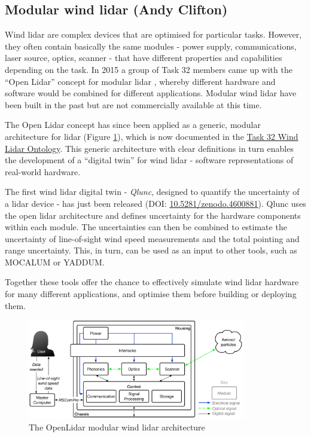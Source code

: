 \subsection{Modular wind lidar (Andy Clifton)}
\begin{altquote}
Wind lidar are complex devices that are optimised for particular tasks. However, they often contain basically the same modules - power supply, communications, laser source, optics, scanner - that have different properties and capabilities depending on the task. In 2015 a group of Task 32 members came up with the “Open Lidar” concept for modular lidar \citep{clifton_2019_openlidar}, whereby different hardware and software would be combined for different applications. Modular wind lidar have been built in the past but are not commercially available at this time.

The Open Lidar concept has since been applied as a generic, modular architecture for lidar (Figure \ref{fig:modular_lidar}), which is now documented in the \href{http://data.windenergy.dtu.dk/ontologies/view/ontolidar/en/}{Task 32 Wind Lidar Ontology}. This generic architecture with clear definitions in turn enables the development of a “digital twin” for wind lidar - software representations of real-world hardware.

The first wind lidar digital twin - \emph{Qlunc}, designed to quantify the uncertainty of a lidar device - has just been released (DOI: \href{https://doi.org/10.5281/zenodo.4600881}{10.5281/zenodo.4600881}). Qlunc uses the open lidar architecture and defines uncertainty for the hardware components within each module. The uncertainties can then be combined to estimate the uncertainty of line-of-sight wind speed measurements and the total pointing and range uncertainty. This, in turn, can be used as an input to other tools, such as MOCALUM or YADDUM.

Together these tools offer the chance to effectively simulate wind lidar hardware for many different applications, and optimise them before building or deploying them.
\end{altquote}

\begin{figure}[!h]
    \centering
    \includegraphics[width=0.85\textwidth]{figures/OpenLidarModules.png}
    \caption{The OpenLidar modular wind lidar architecture \cite{clifton_2019_openlidar}}
    \label{fig:modular_lidar}
\end{figure}
